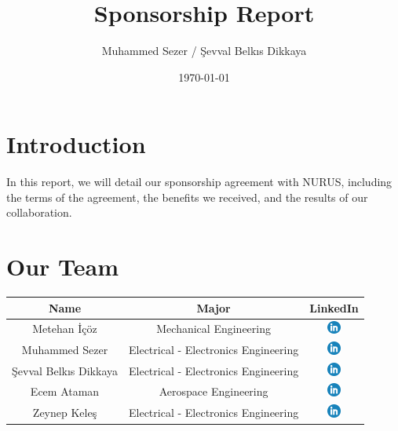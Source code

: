 \documentclass{article}
\title{Sponsorship Report}
\author{Muhammed Sezer / Şevval Belkıs Dikkaya}
\date{\today}
\begin{document}
\maketitle

\section{Introduction}

In this report, we will detail our sponsorship agreement with NURUS, including the terms of the agreement, the benefits we received, and the results of our collaboration.
\section{Our Team}

\begin{tabular}{|c|c|c|}
    \hline
    Name & Major & LinkedIn \\
    \hline
    Metehan İçöz & Mechanical Engineering & \href{https://www.linkedin.com/in/metehan-içöz-735bab206/}{\includegraphics[height=1.2em]{linkedin.png}} \\
    Muhammed Sezer & Electrical - Electronics Engineering & \href{https://www.linkedin.com/in/muhammed-sezer-160428208/}{\includegraphics[height=1.2em]{linkedin.png}} \\
    Şevval Belkıs Dikkaya & Electrical - Electronics Engineering & \href{https://www.linkedin.com/in/sbdikkaya/}{\includegraphics[height=1.2em]{linkedin.png}} \\
    Ecem Ataman & Aerospace Engineering & \href{https://www.linkedin.com/in/ecemataman/}{\includegraphics[height=1.2em]{linkedin.png}} \\
    Zeynep Keleş & Electrical - Electronics Engineering & \href{https://www.linkedin.com/in/zeynep-bilge-keleş-7ba917255/}{\includegraphics[height=1.2em]{linkedin.png}} \\
    \hline
\end{tabular}
\end{document}
